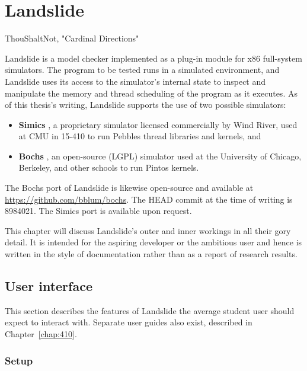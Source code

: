 \chapter{Landslide}
{ThouShaltNot, "Cardinal Directions"}

Landslide is a model checker implemented as a plug-in module for x86 full-system simulators.
The program to be tested runs in a simulated environment,
and Landslide uses its access to the simulator's internal state to inspect and manipulate the memory and thread scheduling of the program as it executes.
As of this thesis's writing, Landslide supports the use of two possible simulators:

\begin{itemize}
	\item {\bf Simics} \cite{simics}, a proprietary simulator licensed commercially by Wind River, used at CMU in 15-410 to run Pebbles thread libraries and kernels, and
	\item {\bf Bochs} \cite{bochs}, an open-source (LGPL) simulator used at the University of Chicago, Berkeley, and other schools to run Pintos kernels.
\end{itemize}

The Bochs port of Landslide is likewise open-source and available at \url{https://github.com/bblum/bochs}.
The HEAD commit at the time of writing is 8984021.
The Simics port is available upon request.

This chapter will discuss Landslide's outer and inner workings in all their gory detail.
It is intended for the aspiring developer or the ambitious user
and hence is written in the style of documentation rather than as a report of research results.

\section{User interface}

This section describes the features of Landslide the average student user should expect to interact with.
Separate user guides also exist, described in Chapter~\ref{chap:410}.

\subsection{Setup}

